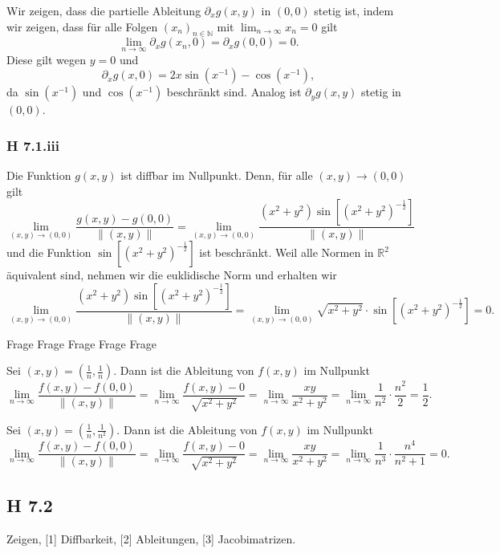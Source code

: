 \documentclass[draft,a5paper]{article}
\theoremstyle{remark}
\newcommand{\enVert}[1]{\left\lVert#1\right\rVert}
\let\norm=\enVert
\begin{document}
Wir zeigen, dass die partielle Ableitung \(\partial_{x}g(x, y)\) in \((0,
0)\) stetig ist, indem wir zeigen, dass für alle Folgen
\((x_{n})_{n \in \mathbb{N}}\) mit \(\lim_{n \to \infty}{x_{n}} = 0\) gilt
\[\lim_{n \to \infty}{\partial_{x}g(x_{n}, 0)} = \partial_{x}g(0, 0) = 0.\]
Diese gilt wegen \(y = 0\) und
\[
  \partial_{x}g(x, 0) = 2x \sin(x^{-1}) - \cos(x^{-1}),
\]
da \(\sin(x^{-1})\) und \(\cos(x^{-1})\) beschränkt sind.  Analog ist
\(\partial_{y}g(x, y)\) stetig in \((0, 0)\).

\subsubsection*{H 7.1.iii}
Die Funktion \(g(x, y)\) ist diffbar im Nullpunkt.  Denn, für alle
\((x, y) \to (0, 0)\) gilt
\[ \lim_{(x, y) \to (0, 0)}{\frac{g(x, y) - g(0, 0)}{\norm{(x, y)}}} =
  \lim_{(x, y) \to (0, 0)}{\frac{(x^{2} + y^{2})
      \sin{[(x^{2}+y^{2})^{-\frac{1}{2}}]}}{\norm{(x, y)}}}
\] und die Funktion \(\sin{[(x^{2}+y^{2})^{-\frac{1}{2}}]}\) ist
beschränkt.  Weil alle Normen in \(\mathbb{R}^{2}\) äquivalent sind, nehmen wir
die euklidische Norm und erhalten wir
\[
  \lim_{(x, y) \to (0, 0)}{\frac{(x^{2} + y^{2})
      \sin{[(x^{2}+y^{2})^{-\frac{1}{2}}]}}{\norm{(x, y)}}}
  = \lim_{(x, y) \to (0, 0)}{\sqrt{x^{2} + y^{2}} \cdot
    \sin{[(x^{2}+y^{2})^{-\frac{1}{2}}]}} = 0.
\]

{\Huge Frage Frage Frage Frage Frage}

Sei \((x, y) = (\frac{1}{n}, \frac{1}{n})\).  Dann ist die Ableitung
von \(f(x, y)\) im Nullpunkt
\[ \lim_{n \to \infty}{\frac{f(x, y) - f(0, 0)}{\norm{(x, y)}}} = \lim_{n \to
    \infty}{\frac{f(x, y) - 0}{\sqrt{x^{2} + y^{2}}}} = \lim_{n \to
    \infty}{\frac{xy}{x^{2} + y^{2}}} = \lim_{n \to
    \infty}{\frac{1}{n^{2}}\cdot\frac{n^{2}}{2}} = \frac{1}{2}.
\]

Sei \((x, y) = (\frac{1}{n}, \frac{1}{n^{2}})\).  Dann ist die
Ableitung von \(f(x, y)\) im Nullpunkt
\[ \lim_{n \to \infty}{\frac{f(x, y) - f(0, 0)}{\norm{(x, y)}}} = \lim_{n \to
    \infty}{\frac{f(x, y) - 0}{\sqrt{x^{2} + y^{2}}}} = \lim_{n \to
    \infty}{\frac{xy}{x^{2} + y^{2}}} = \lim_{n \to
    \infty}{\frac{1}{n^{3}}\cdot\frac{n^{4}}{n^{2}+1}} = 0.
\]

\subsection*{H 7.2}
Zeigen, [1] Diffbarkeit, [2] Ableitungen, [3] Jacobimatrizen.
\end{document}
